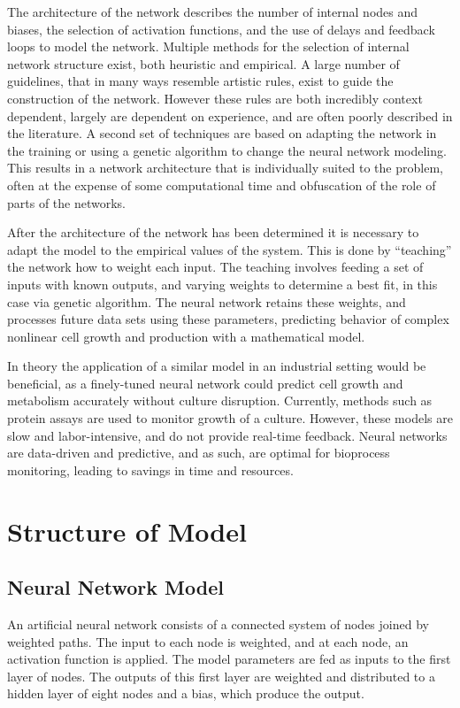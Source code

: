 \documentclass[10pt]{article}
\begin{document}
The architecture of the network describes the number of internal nodes and biases, the selection of activation functions, and the use of delays and feedback loops to model the network. Multiple methods for the selection of internal network structure exist, both heuristic and empirical. A large number of guidelines, that in many ways resemble artistic rules, exist to guide the construction of the network. However these rules are both incredibly context dependent, largely are dependent on experience, and are often poorly described in the literature. A second set of techniques are based on adapting the network in the training or using a genetic algorithm to change the neural network modeling. This results in a network architecture that is individually suited to the problem, often at the expense of some computational time and obfuscation of the role of parts of the networks.

After the architecture of the network has been determined it is necessary to adapt the model to the empirical values of the system. This is done by “teaching” the network how to weight each input. The teaching involves feeding a set of inputs with known outputs, and varying weights to determine a best fit, in this case via genetic algorithm. The neural network retains these weights, and processes future data sets using these parameters, predicting behavior of complex nonlinear cell growth and production with a mathematical model.

In theory the application of a similar model in an industrial setting would be beneficial, as a finely-tuned neural network could predict cell growth and metabolism accurately without culture disruption. Currently, methods such as protein assays are used to monitor growth of a culture. However, these models are slow and labor-intensive, and do not provide real-time feedback. Neural networks are data-driven and predictive, and as such, are optimal for bioprocess monitoring, leading to savings in time and resources.

\section{Structure of Model}
\label{sec:model}

\subsection{Neural Network Model}
An artificial neural network consists of a connected system of nodes joined by weighted paths. The input to each node is weighted, and at each node, an activation function is applied. The model parameters are fed as inputs to the first layer of nodes. The outputs of this first layer are weighted and distributed to a hidden layer of eight nodes and a bias, which produce the output.
\end{document}

